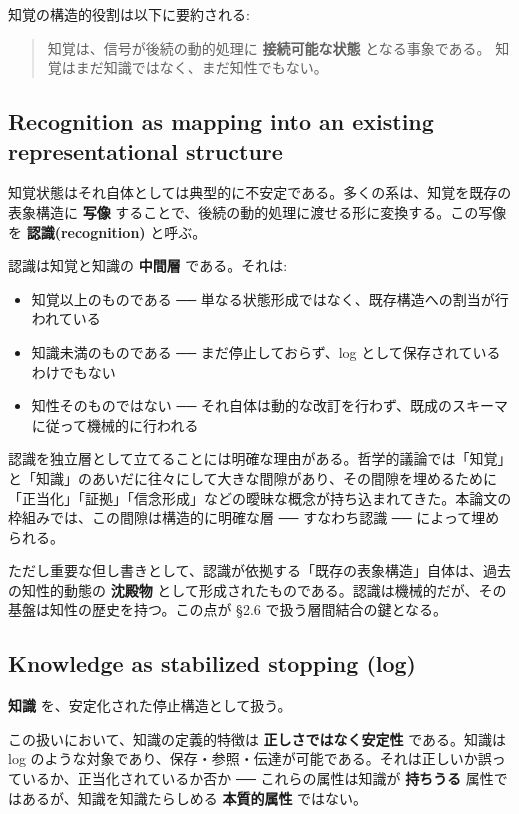 知覚の構造的役割は以下に要約される:

\begin{quote}
知覚は、信号が後続の動的処理に \textbf{接続可能な状態} となる事象である。
知覚はまだ知識ではなく、まだ知性でもない。
\end{quote}

\subsection{Recognition as mapping into an existing representational structure}


知覚状態はそれ自体としては典型的に不安定である。多くの系は、知覚を既存の表象構造に \textbf{写像} することで、後続の動的処理に渡せる形に変換する。この写像を \textbf{認識(recognition)} と呼ぶ。

認識は知覚と知識の \textbf{中間層} である。それは:

\begin{itemize}
\item 知覚以上のものである ── 単なる状態形成ではなく、既存構造への割当が行われている
\item 知識未満のものである ── まだ停止しておらず、log として保存されているわけでもない
\item 知性そのものではない ── それ自体は動的な改訂を行わず、既成のスキーマに従って機械的に行われる
\end{itemize}

認識を独立層として立てることには明確な理由がある。哲学的議論では「知覚」と「知識」のあいだに往々にして大きな間隙があり、その間隙を埋めるために「正当化」「証拠」「信念形成」などの曖昧な概念が持ち込まれてきた。本論文の枠組みでは、この間隙は構造的に明確な層 ── すなわち認識 ── によって埋められる。

ただし重要な但し書きとして、認識が依拠する「既存の表象構造」自体は、過去の知性的動態の \textbf{沈殿物} として形成されたものである。認識は機械的だが、その基盤は知性の歴史を持つ。この点が \S{}2.6 で扱う層間結合の鍵となる。

\subsection{Knowledge as stabilized stopping (log)}


\textbf{知識} を、安定化された停止構造として扱う。

この扱いにおいて、知識の定義的特徴は \textbf{正しさではなく安定性} である。知識は log のような対象であり、保存・参照・伝達が可能である。それは正しいか誤っているか、正当化されているか否か ── これらの属性は知識が \textbf{持ちうる} 属性ではあるが、知識を知識たらしめる \textbf{本質的属性} ではない。

